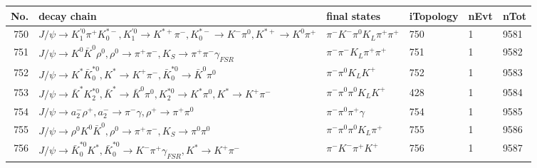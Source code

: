 \begin{table}[htbp] 
\begin{center}
\begin{small}
\begin{tabular}{rlllll}\hline\hline
 No. & decay chain & final states &  iTopology & nEvt & nTot \\\hline
750&$J/\psi       \rightarrow K_1^{'0}      \pi^{+}        K_{0}^{*-}     , K_1^{'0}       \rightarrow K^{*+}         \pi^{-}        , K_{0}^{*-}      \rightarrow K^{-}          \pi^{0}        , K^{*+}          \rightarrow K^{0}          \pi^{+}        $&$\pi^{-}        K^{-}          \pi^{0}        K_{L}          \pi^{+}        \pi^{+}        $&  750&    1& 9581\\
751&$J/\psi       \rightarrow K^{0}          \bar{K}^{0}   \rho^{0}      , \rho^{0}       \rightarrow \pi^{+}        \pi^{-}        , K_{S}           \rightarrow \pi^{+}        \pi^{-}        \gamma_{FSR} $&$\pi^{-}        \pi^{-}        K_{L}          \pi^{+}        \pi^{+}        $&  751&    1& 9582\\
752&$J/\psi       \rightarrow K^{*}          \bar{K}_0^{*0}, K^{*}           \rightarrow K^{+}          \pi^{-}        , \bar{K}_0^{*0} \rightarrow \bar{K}^{0}   \pi^{0}        $&$\pi^{-}        \pi^{0}        K_{L}          K^{+}          $&  752&    1& 9583\\
753&$J/\psi       \rightarrow \bar{K}^{*}   K_2^{*0}       , \bar{K}^{*}    \rightarrow \bar{K}^{0}   \pi^{0}        , K_2^{*0}        \rightarrow K^{*}          \pi^{0}        , K^{*}           \rightarrow K^{+}          \pi^{-}        $&$\pi^{-}        \pi^{0}        \pi^{0}        K_{L}          K^{+}          $&  428&    1& 9584\\
754&$J/\psi       \rightarrow a_{2}^{-}      \rho^{+}      , a_{2}^{-}       \rightarrow \pi^{-}        \gamma       , \rho^{+}       \rightarrow \pi^{+}        \pi^{0}        $&$\pi^{-}        \pi^{0}        \pi^{+}        \gamma       $&  754&    1& 9585\\
755&$J/\psi       \rightarrow \rho^{0}      K^{0}          \bar{K}^{0}   , \rho^{0}       \rightarrow \pi^{+}        \pi^{-}        , K_{S}           \rightarrow \pi^{0}        \pi^{0}        $&$\pi^{-}        \pi^{0}        \pi^{0}        K_{L}          \pi^{+}        $&  755&    1& 9586\\
756&$J/\psi       \rightarrow \bar{K}_0^{*0}K^{*}          , \bar{K}_0^{*0} \rightarrow K^{-}          \pi^{+}        \gamma_{FSR} , K^{*}           \rightarrow K^{+}          \pi^{-}        $&$\pi^{-}        K^{-}          \pi^{+}        K^{+}          $&  756&    1& 9587\\

\end{tabular}
\end{small}
\end{center}
\end{table}
